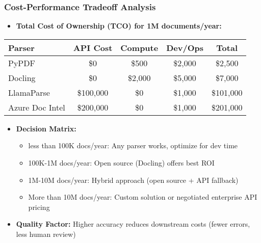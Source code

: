 \begin{frame}[fragile]\frametitle{Cost-Performance Tradeoff Analysis}
      \begin{itemize}
        \item \textbf{Total Cost of Ownership (TCO) for 1M documents/year:}
      \end{itemize}

\begin{table}[h]
\centering
\small
\begin{tabular}{|l|c|c|c|c|}
\hline
\textbf{Parser} & \textbf{API Cost} & \textbf{Compute} & \textbf{Dev/Ops} & \textbf{Total} \\
\hline
PyPDF & \$0 & \$500 & \$2,000 & \$2,500 \\
\hline
Docling & \$0 & \$2,000 & \$5,000 & \$7,000 \\
\hline
LlamaParse & \$100,000 & \$0 & \$1,000 & \$101,000 \\
\hline
Azure Doc Intel & \$200,000 & \$0 & \$1,000 & \$201,000 \\
\hline
\end{tabular}
\end{table}

      \begin{itemize}
        \item \textbf{Decision Matrix:}
        \begin{itemize}
            \item less than 100K docs/year: Any parser works, optimize for dev time
            \item 100K-1M docs/year: Open source (Docling) offers best ROI
            \item 1M-10M docs/year: Hybrid approach (open source + API fallback)
            \item More than 10M docs/year: Custom solution or negotiated enterprise API pricing
        \end{itemize}
        \item \textbf{Quality Factor:} Higher accuracy reduces downstream costs (fewer errors, less human review)
      \end{itemize}
\end{frame}

